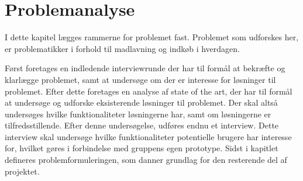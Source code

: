 \chapter{Problemanalyse}\label{chapter:problemanalyse}
I dette kapitel lægges rammerne for problemet fast.
Problemet som udforskes her, er problematikker i forhold til madlavning og indkøb i hverdagen. 

Først foretages en indledende interviewrunde der har til formål at bekræfte og klarlægge problemet, samt at undersøge om der er interesse for løsninger til problemet.
Efter dette foretages en analyse af state of the art, der har til formål at undersøge og udforske eksisterende løsninger til problemet.
Der skal altså undersøges hvilke funktionaliteter løsningerne har, samt om løsningerne er tilfredsstillende.
Efter denne undersøgelse, udføres endnu et interview.
Dette interview skal undersøge hvilke funktionaliteter potentielle brugere har interesse for, hvilket gøres i forbindelse med gruppens egen prototype.
Sidst i kapitlet defineres problemformuleringen, som danner grundlag for den resterende del af projektet.






